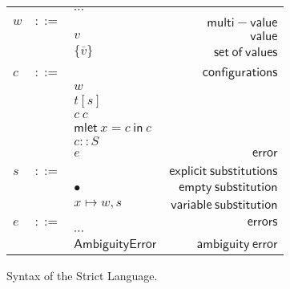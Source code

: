 \documentclass[preprint,authoryear,sort&compress,9pt,nocopyrightspace]{article}
\newcommand{\ascripS}[1]{#1::S}
\newcommand{\oletP}[3]{\mathsf{mlet} \ x = #2 \ \mathsf{in}  \ #3}
\newcommand{\nameerror}{\mathsf{NameError}}
\newcommand{\typeerror}{\mathsf{TypeError}}
\newcommand{\dispatcherror}{\mathsf{DispatchError}}
\newcommand{\ambiguityerror}{\mathsf{AmbiguityError}}
\newcommand{\semanticC}{Strict Language}
\begin{document}
\begin{figure}[]
\begin{small}
\begin{center}
\hspace*{-2cm}
\begin{tabular}{|l c l r|}
\hline
&&$\cdots$&\\
$w$&$::=$&&$\mathsf {multi-value}$\\
&&$v$&$\mathsf {value}$\\
&&$\{\overline{v}\}$&$\mathsf {set \ of \ values}$\\
&&&\\
$c$&$::=$&&$\mathsf {configurations}$\\
&&$w$&\\
&&$t[s]$&\\
&&$c \ c $&\\
&&$\oletP {T}{c}{c}$&\\
&&$\ascripS{c}$&\\
&&$e$&$\mathsf {error}$\\
&&&\\
$s$&$::=$&&$\mathsf {explicit \ substitutions}$\\
&&$ \bullet$&$\mathsf {empty \ substitution}$\\
&&$x \mapsto w, s$&$\mathsf {variable \ substitution}$\\
&&&\\
$e$&$::=$&&$\mathsf {errors}$\\
&&$\cdots$&\\
&&$\ambiguityerror$&$\mathsf {ambiguity \ error}$\\
\hline
\end{tabular}
\hspace*{-2cm}
\caption{Syntax of the \semanticC.}
\label{figure:SYNTAX4}
\end{center}
\end{small}
\end{figure}
\end{document}
